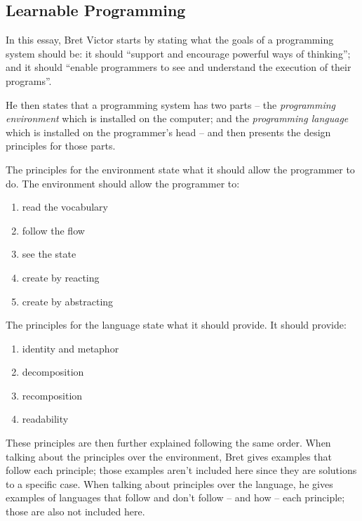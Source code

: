 \documentclass{./llncs2e/llncs}
\begin{document}
\subsection{Learnable Programming\cite{victor2012learnable}}
	In this essay, Bret Victor starts by stating what the goals of a programming system should be: it should ``support and encourage powerful ways of thinking''; and it should ``enable programmers to see and understand the execution of their programs''.

	He then states that a programming system has two parts -- the \emph{programming environment} which is installed on the computer; and the \emph{programming language} which is installed on the programmer's head -- and then presents the design principles for those parts.

	The principles for the environment state what it should allow the programmer to do. 
	The environment should allow the programmer to:
	\begin{enumerate}
		\item \label{lp:env:read} read the vocabulary 
		\item \label{lp:env:flow} follow the flow
		\item \label{lp:env:state} see the state
		\item \label{lp:env:react} create by reacting
		\item \label{lp:env:abstr} create by abstracting
	\end{enumerate}

	The principles for the language state what it should provide. 
	It should provide:
	\begin{enumerate}
		\item \label{lp:lang:id} identity and metaphor
		\item \label{lp:lang:decom} decomposition
		\item \label{lp:lang:recom} recomposition
		\item \label{lp:lang:read} readability
	\end{enumerate}

	These principles are then further explained following the same order. 
	When talking about the principles over the environment, Bret gives examples that follow each principle; those examples aren't included here since they are solutions to a specific case. 
	When talking about principles over the language, he gives examples of languages that follow and don't follow -- and how -- each principle; those are also not included here.
\end{document}
